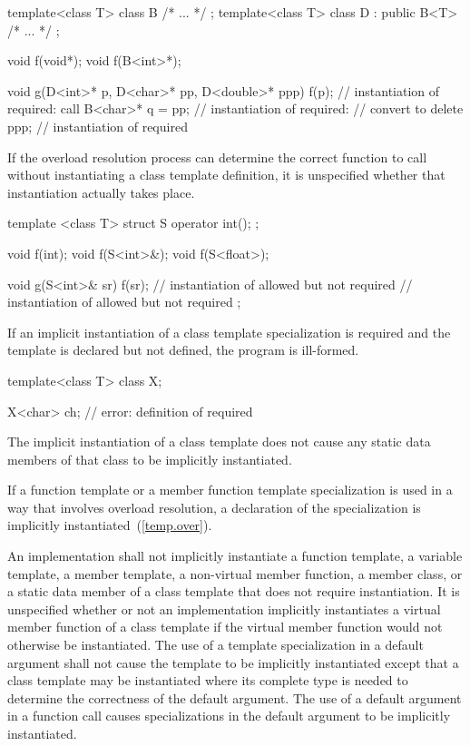 \begin{codeblock}
template<class T> class B { /* ... */ };
template<class T> class D : public B<T> { /* ... */ };

void f(void*);
void f(B<int>*);

void g(D<int>* p, D<char>* pp, D<double>* ppp) {
  f(p);             // instantiation of  required: call 
  B<char>* q = pp;  // instantiation of  required:
                    // convert  to 
  delete ppp;       // instantiation of  required
}
\end{codeblock}
\exitexample

\pnum
If the overload resolution process can determine the correct function to
call without instantiating a class template definition, it is unspecified
whether that instantiation actually takes place.
\enterexample

\begin{codeblock}
template <class T> struct S {
  operator int();
};

void f(int);
void f(S<int>&);
void f(S<float>);

void g(S<int>& sr) {
  f(sr);            // instantiation of  allowed but not required
                    // instantiation of  allowed but not required
};
\end{codeblock}
\exitexample

\pnum
If an implicit instantiation of a class template specialization is required and
the template is declared but not defined, the program is ill-formed.
\enterexample

\begin{codeblock}
template<class T> class X;

X<char> ch;         // error: definition of  required
\end{codeblock}
\exitexample

\pnum
The implicit instantiation of a class template does not cause any static data
members of that class to be implicitly instantiated.

\pnum
If a function template or a member function template specialization is used in
a way that involves overload resolution,
a declaration of the specialization is implicitly instantiated~(\ref{temp.over}).

\pnum
An implementation shall not implicitly instantiate a function template,
a variable template,
a member template, a non-virtual member function, a member class, or a
static data member of a class template that does not require instantiation.
It is unspecified whether or not an implementation implicitly instantiates a
virtual member function of a class template if the virtual member function would
not otherwise be instantiated.
The use of a template specialization in a default argument
shall not cause the template to be implicitly instantiated except that a
class template may be instantiated where its complete type is needed to determine
the correctness of the default argument.
The use of a default argument in a
function call causes specializations in the default argument to be implicitly
instantiated.

